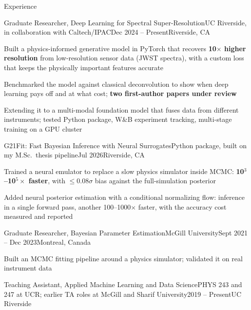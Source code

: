 \documentclass[]{kyvernitis-resume}
\begin{document}
\begin{section}{Experience}

\begin{subsection}{Graduate Researcher, Deep Learning for Spectral Super-Resolution}{UC Riverside, in collaboration with Caltech/IPAC}{Dec 2024 -- Present}{Riverside, CA}
    \item Built a physics-informed generative model in PyTorch that recovers \textbf{10$\times$ higher resolution} from low-resolution sensor data (JWST spectra), with a custom loss that keeps the physically important features accurate
    \item Benchmarked the model against classical deconvolution to show when deep learning pays off and at what cost; \textbf{two first-author papers under review}
    \item Extending it to a multi-modal foundation model that fuses data from different instruments; tested Python package, W\&B experiment tracking, multi-stage training on a GPU cluster
\end{subsection}

\begin{subsection}{G21Fit: Fast Bayesian Inference with Neural Surrogates}{Python package, built on my M.Sc.\ thesis pipeline}{Jul 2026}{Riverside, CA}
    \item Trained a neural emulator to replace a slow physics simulator inside MCMC: \textbf{10$^3$--10$^5\times$ faster}, with $\leq$0.08$\sigma$ bias against the full-simulation posterior
    \item Added neural posterior estimation with a conditional normalizing flow: inference in a single forward pass, another 100--1000$\times$ faster, with the accuracy cost measured and reported
\end{subsection}

\begin{subsection}{Graduate Researcher, Bayesian Parameter Estimation}{McGill University}{Sept 2021 -- Dec 2023}{Montreal, Canada}
    \item Built an MCMC fitting pipeline around a physics simulator; validated it on real instrument data
\end{subsection}

\begin{subsectionnobullet}{Teaching Assistant, Applied Machine Learning and Data Science}{PHYS 243 and 247 at UCR; earlier TA roles at McGill and Sharif University}{2019 -- Present}{UC Riverside}
\end{subsectionnobullet}
\end{section}
\end{document}
